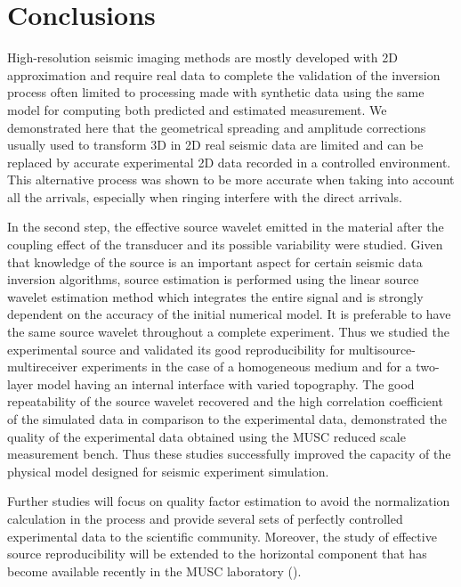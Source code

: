 \documentclass[extra,mreferee]{gji}
\begin{document}

\section{Conclusions}
 
High-resolution seismic imaging methods are mostly developed with 2D approximation and require real data to complete the validation of the inversion process often limited to processing made with synthetic data using the same model for computing both predicted and estimated measurement. We demonstrated here that the geometrical spreading and amplitude corrections usually used to transform 3D in 2D real seismic data are limited and can be replaced by accurate experimental 2D data recorded in a controlled environment. This alternative process was shown to be more accurate when taking into account all the arrivals, especially 
when ringing interfere with the direct arrivals.

In the second step, the effective source wavelet emitted in the material after the coupling effect of the transducer and its possible variability were studied. Given that knowledge of the source is an important aspect for certain seismic data inversion algorithms, source estimation is performed using the linear source wavelet estimation method which integrates the entire signal and is strongly dependent on the accuracy of the initial numerical model. It is preferable to have the same source wavelet throughout a complete experiment. Thus we studied the experimental source and validated its good reproducibility for multisource-multireceiver experiments in the case of a homogeneous medium and for a two-layer model having an internal interface with varied topography. The good repeatability of the source wavelet recovered and the high correlation coefficient of the simulated data in comparison to the experimental data, demonstrated the quality of the experimental data obtained using the MUSC reduced scale measurement bench. 
Thus these studies successfully improved the capacity of the physical model designed for seismic experiment simulation. 

Further studies will focus on quality factor estimation to avoid the normalization calculation in the process and provide several sets of perfectly controlled experimental data to the scientific community. Moreover, the study of effective source reproducibility will be extended to the horizontal component that has become available recently in the MUSC laboratory (\cite{valensi2015multicomponent}).
\end{document}
